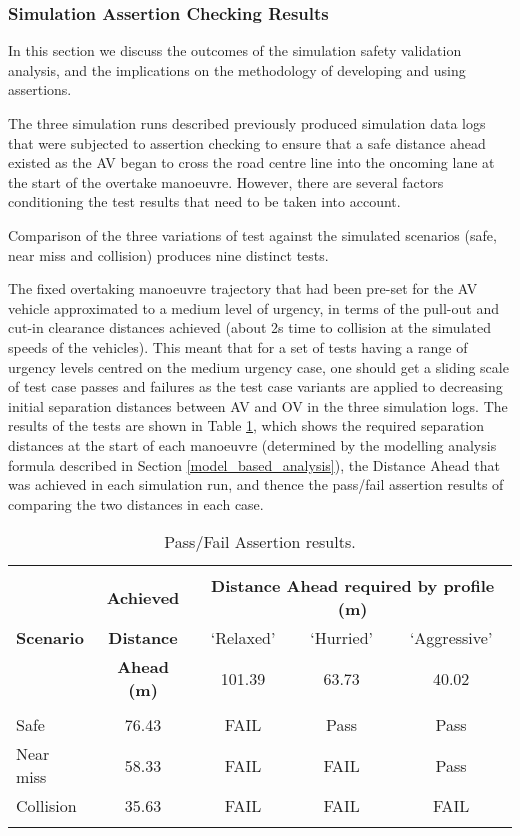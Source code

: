 \subsubsection{Simulation Assertion Checking 
Results} \label{sim_results}
In this section we discuss the outcomes of the simulation safety validation analysis, and the implications on the methodology of developing and using assertions.

The three simulation runs described previously produced simulation data logs that were subjected to assertion checking to ensure that a safe distance ahead existed as the AV began to cross the road centre line into the oncoming lane at the start of the overtake manoeuvre. However, there are several factors conditioning the test results that need to be taken into account.

Comparison of the three variations of test against the simulated scenarios (safe, near miss and collision) produces nine distinct tests. 

The fixed overtaking manoeuvre trajectory that had been pre-set for the AV vehicle approximated to a medium level of urgency, in terms of the pull-out and cut-in clearance distances achieved (about 2s time to collision at the simulated speeds of the vehicles). This meant that for a set of tests having a range of urgency levels centred on the medium urgency case, one should get a sliding scale of test case passes and failures as the test case variants are applied to decreasing initial separation distances between AV and OV in the three simulation logs. The results of the tests are shown in Table \ref{Overtaking_Profiles}, which shows the required separation distances at the start of each manoeuvre (determined by the modelling analysis formula described in Section \ref{model_based_analysis}), the Distance Ahead that was achieved in each simulation run, and thence the pass/fail assertion results of comparing the two distances in each case.

\begin{table}[h]
\centering
\begin{tabular}{lcccc}
\hline
\\
\multirow{3}{*}{\textbf{Scenario}} & \textbf{Achieved} & \multicolumn{3}{c}{
\textbf{Distance Ahead required by profile (m)}}\\ %
& \textbf{Distance} & `Relaxed' & `Hurried' & `Aggressive' \\
& \textbf{Ahead (m)} & 101.39 & 63.73 & 40.02 \\
\\
%
Safe & 76.43 & FAIL & Pass & Pass\\
%
Near miss & 58.33 & FAIL & FAIL & Pass\\
%
Collision & 35.63 & FAIL & FAIL & FAIL\\
\\
\hline
\end{tabular}
\caption{Pass/Fail Assertion results.} \label{Overtaking_Profiles}
\end{table}

